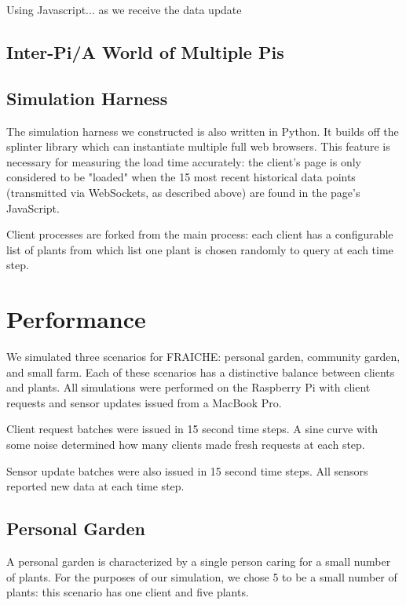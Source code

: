 \documentclass[a4paper]{acm_proc_article-sp}
\begin{document}
Using Javascript... as we receive the data update

\subsection{Inter-Pi/A World of Multiple Pis}

\subsection{Simulation Harness}

The simulation harness we constructed is also written in Python.  It builds off the splinter \cite{} library which can instantiate multiple full web browsers.  This feature is necessary for measuring the load time accurately: the client's page is only considered to be "loaded" when the 15 most recent historical data points (transmitted via WebSockets, as described above) are found in the page's JavaScript.

Client processes are forked from the main process: each client has a configurable list of plants from which list one plant is chosen randomly to query at each time step.  

\section{Performance}

We simulated three scenarios for FRAICHE: personal garden, community garden, and small farm.  Each of these scenarios has a distinctive balance between clients and plants.  All simulations were performed on the Raspberry Pi with client requests and sensor updates issued from a MacBook Pro.

Client request batches were issued in 15 second time steps.  A sine curve with some noise determined how many clients made fresh requests at each step.

Sensor update batches were also issued in 15 second time steps.  All sensors reported new data at each time step.

\subsection{Personal Garden}

A personal garden is characterized by a single person caring for a small number of plants.  For the purposes of our simulation, we chose 5 to be a small number of plants: this scenario has one client and five plants.
\end{document}
